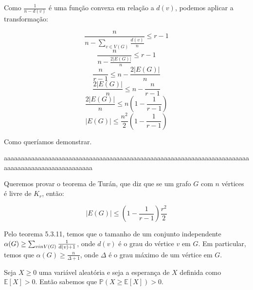 \documentclass{article}
\begin{document}
\begin{itemize}
	      Como \(\frac{1}{n - d(v)}\) é uma função convexa em relação a \(d(v)\), podemos aplicar a transformação:

	      \[\frac{n}{n - \sum_{v \in V(G)} \frac{d(v)}{n}} \leq r - 1\]
	      \[\frac{n}{n - \frac{2 |E(G)|}{n}} \leq r - 1\]
	      \[\frac{n}{r - 1} \leq n - \frac{2 |E(G)|}{n}\]
	      \[\frac{2 |E(G)|}{n} \leq n - \frac{n}{r - 1}\]
	      \[\frac{2 |E(G)|}{n} \leq n (1 - \frac{1}{r - 1})\]
	      \[|E(G)| \leq \frac{n^2}{2} (1 - \frac{1}{r - 1})\]

	      Como queríamos demonstrar.

	      aaaaaaaaaaaaaaaaaaaaaaaaaaaaaaaaaaaaaaaaaaaaaaaaaaaaaaaaaaaaaaaaaaaaaaaaaaaaaaaaaaaaaaaaaaaaaaaaaa


	      Queremos provar o teorema de Turán, que diz que se um grafo \(G\) com \(n\) vértices é livre de \(K_r\), então:

	      \[|E(G)| \leq (1 - \frac{1}{r-1})\frac{r^2}{2}\]

	      Pelo teorema 5.3.11, temos que o tamanho de um conjunto independente \(\alpha(G) \geq \sum_{v \\in V(G)}\frac{1}{d(v)+1}\), onde \(d(v)\) é o grau do vértice \(v\) em \(G\). Em particular,
	      temos que \(\alpha(G) \geq \frac{n}{\Delta + 1}\), onde \(\Delta\) é o grau máximo de um vértice em \(G\).

	      Seja \(X \geq 0\) uma variável aleatória e seja a esperança de \(X\) definida como \(\mathbb{E}[X] > 0\). Então sabemos que \(\mathbb{P}(X \geq \mathbb{E}[X]) > 0\).




\end{itemize}
\end{document}

